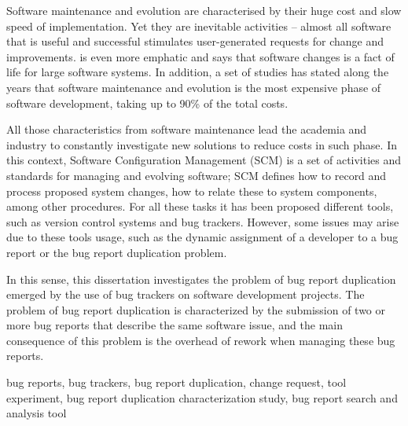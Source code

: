 Software maintenance and evolution are characterised by their huge cost and
slow speed of implementation. Yet they are inevitable activities -- almost all
software that is useful and successful stimulates user-generated requests for
change and improvements. \citeauthor{Sommerville2007} is
even more emphatic and says that software changes is a fact of life for large
software systems. In addition, a set of studies has stated along the years that
software maintenance and evolution is the most expensive phase of software
development, taking up to 90\% of the total costs.

All those characteristics from software maintenance lead the academia and
industry to constantly investigate new solutions to reduce costs in such
phase. In this context, Software Configuration Management (SCM) is a set of
activities and standards for managing and evolving software; SCM defines how
to record and process proposed system changes, how to relate these to system
components, among other procedures. For all these tasks it has been proposed
different tools, such as version control systems and bug trackers. However, some
issues may arise due to these tools usage, such as the dynamic assignment of a
developer to a bug report or the bug report duplication problem.

In this sense, this dissertation investigates the problem of bug report
duplication emerged by the use of bug trackers on software development
projects. The problem of bug report duplication is characterized by the
submission of two or more bug reports that describe the same software issue, and
the main consequence of this problem is the overhead of rework when managing
these bug reports.

\begin{keywords}
bug reports, bug trackers, bug report duplication, change request,
tool experiment, bug report duplication characterization study, bug report
search and analysis tool
\end{keywords}